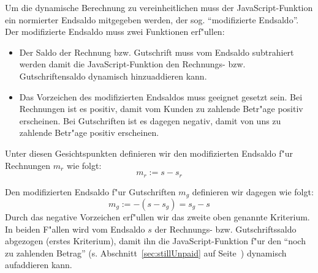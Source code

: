\documentclass[a4paper]{article}
\numberwithin{equation}{section}
\begin{document}
Um die dynamische Berechnung zu vereinheitlichen muss der JavaScript-Funktion
ein normierter Endsaldo mitgegeben werden, der sog. "`modifizierte Endsaldo"'.
Der modifizierte Endsaldo muss zwei Funktionen erf"ullen:
\begin{itemize}
  \item Der Saldo der Rechnung bzw. Gutschrift muss vom Endsaldo subtrahiert
    werden damit die JavaScript-Funktion den Rechnungs- bzw. Gutschriftensaldo
    dynamisch hinzuaddieren kann.
  \item Das Vorzeichen des modifizierten Endsaldos muss geeignet gesetzt sein.
    Bei Rechnungen ist es positiv, damit vom Kunden zu zahlende Betr"age
    positiv erscheinen. Bei Gutschriften ist es dagegen negativ, damit von uns
    zu zahlende Betr"age positiv erscheinen.
\end{itemize}

\noindent Unter diesen Gesichtspunkten definieren wir den modifizierten Endsaldo 
f"ur Rechnungen $m_r$ wie folgt:
\begin{equation}m_r := s - s_r\end{equation}

\noindent Den modifizierten Endsaldo f"ur Gutschriften $m_g$ definieren wir
dagegen wie folgt:
\begin{equation}m_g := -(s - s_g) = s_g - s\end{equation}
Durch das negative Vorzeichen erf"ullen wir das zweite oben genannte Kriterium.
In beiden F"allen wird vom Endsaldo $s$ der Rechnungs- bzw. Gutschriftssaldo
abgezogen (erstes Kriterium), damit ihn die JavaScript-Funktion f"ur den "`noch
zu zahlenden Betrag"' (s. Abschnitt~\ref{sec:stillUnpaid} auf 
Seite~\pageref{sec:stillUnpaid}) dynamisch aufaddieren kann.



%
%
%
%
\end{document}
